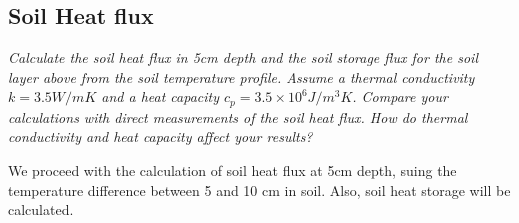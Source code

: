 \documentclass[
]{article}
\newenvironment{Shaded}{\begin{snugshade}}{\end{snugshade}}
\newcommand{\CommentTok}[1]{\textcolor[rgb]{0.56,0.35,0.01}{\textit{#1}}}
\newcommand{\ControlFlowTok}[1]{\textcolor[rgb]{0.13,0.29,0.53}{\textbf{#1}}}
\newcommand{\DecValTok}[1]{\textcolor[rgb]{0.00,0.00,0.81}{#1}}
\newcommand{\FloatTok}[1]{\textcolor[rgb]{0.00,0.00,0.81}{#1}}
\newcommand{\FunctionTok}[1]{\textcolor[rgb]{0.00,0.00,0.00}{#1}}
\newcommand{\NormalTok}[1]{#1}
\newcommand{\OtherTok}[1]{\textcolor[rgb]{0.56,0.35,0.01}{#1}}
\newcommand{\SpecialCharTok}[1]{\textcolor[rgb]{0.00,0.00,0.00}{#1}}
\begin{document}
\hypertarget{soil-heat-flux}{%
\subsection{Soil Heat flux}\label{soil-heat-flux}}

\emph{Calculate the soil heat flux in 5cm depth and the soil storage flux for the soil layer above from the soil temperature profile. Assume a thermal conductivity \(k=3.5 W/m K\) and a heat capacity \(c_p=3.5\times10^6 J/m^3K\). Compare your calculations with direct measurements of the soil heat flux. How do thermal conductivity and heat capacity affect your results?}

We proceed with the calculation of soil heat flux at 5cm depth, suing the temperature difference between 5 and 10 cm in soil. Also, soil heat storage will be calculated.

\begin{Shaded}
\end{Shaded}
\end{document}
